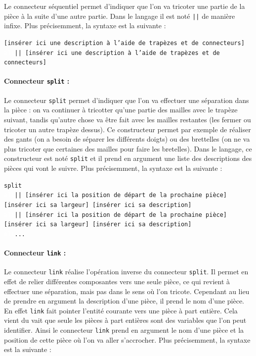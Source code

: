 \documentclass[a4paper,10pt]{article}
\begin{document}
Le connecteur séquentiel permet d'indiquer que l'on va tricoter une partie de la pièce à la suite d'une autre partie. Dans le langage il est noté \texttt{||} de manière infixe. Plus précisemment, la syntaxe est la suivante :

\texttt{[insérer ici une description à l'aide de trapèzes et de connecteurs] \\
  \textcolor{white}{ali}|| [insérer ici une description à l'aide de trapèzes et de connecteurs]}
  
\paragraph{Connecteur \texttt{split} :} 

Le connecteur \texttt{split} permet d'indiquer que l'on va effectuer une séparation dans la pièce : on va continuer à tricotter qu'une partie des mailles avec le trapèze suivant, tandis qu'autre chose va être fait avec les mailles restantes (les fermer ou tricoter un autre trapèze dessus). Ce constructeur permet par exemple de réaliser des gants (on a besoin de séparer les différents doigts) ou des brettelles (on ne va plus tricoter que certaines des mailles pour faire les bretelles). Dans le langage, ce constructeur est noté \texttt{split} et il prend en argument une liste des descriptions des pièces qui vont le suivre. Plus précisemment, la syntaxe est la suivante :

\noindent \texttt{split \\
  \textcolor{white}{ali}|| [insérer ici la position de départ de la prochaine pièce] [insérer ici sa largeur] [insérer ici sa description] \\
  \textcolor{white}{ali}|| [insérer ici la position de départ de la prochaine pièce] [insérer ici sa largeur] [insérer ici sa description] \\
  \textcolor{white}{ali}...}
  
\paragraph{Connecteur \texttt{link} :} 

Le connecteur \texttt{link} réalise l'opération inverse du connecteur \texttt{split}. Il permet en effet de relier différentes composantes vers une seule pièce, ce qui revient à effectuer une séparation, mais pas dans le sens où l'on tricote. Cependant au lieu de prendre en argument la description d'une pièce, il prend le nom d'une pièce. En effet \texttt{link} fait pointer l'entité courante vers une pièce à part entière. Cela vient du vait que seule les pièces à part entières sont des variables que l'on peut identifier. Ainsi le connecteur \texttt{link} prend en argument le nom d'une pièce et la position de cette pièce où l'on va aller s'accrocher. Plus précisemment, la syntaxe est la suivante :
\end{document}
